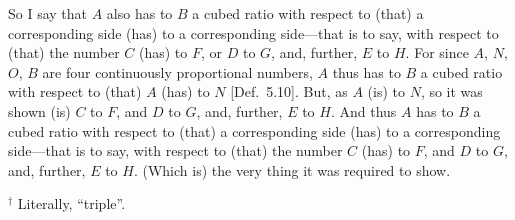 \begin{Parallel}{}{}
{So I say that $A$ also has to $B$ a cubed ratio with respect to (that)
a corresponding side (has) to a corresponding side---that is to say, with respect to (that) the number $C$ (has) to $F$, or $D$ to $G$, and, further,  $E$ to $H$. For
since $A$, $N$, $O$, $B$ are four continuously proportional numbers,
$A$ thus has to $B$	a cubed ratio with respect to (that) $A$ (has)
to $N$ [Def.~5.10]. But, as $A$ (is) to $N$, so
it was shown (is) $C$ to $F$, and $D$ to $G$, and, further, $E$ to $H$. And thus $A$ has to $B$ a cubed ratio with respect to (that) a corresponding
side (has) to a corresponding side---that is to say, with respect to
(that) the number $C$ (has) to $F$, and $D$ to $G$, and, further, $E$ to
$H$. (Which is) the very thing it was required to show.}
\end{Parallel}
{\footnotesize\noindent$^\dag$  Literally, ``triple''.}

